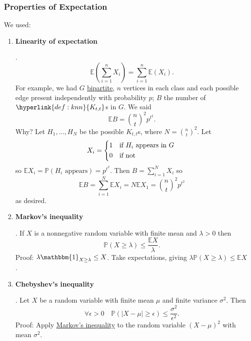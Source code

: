 \documentclass{article}
\begin{document}
\subsubsection*{Properties of Expectation}
We used:
\begin{enumerate}
    \item \hypertarget{def:linear}{\textbf{Linearity of expectation}}.
        \begin{equation*}
            \mathbb{E}\left(\sum_{i=1}^n X_i\right) = \sum_{i=1}^n \mathbb{E}(X_i).
        \end{equation*}
        For example, we had $G$ \hyperlink{def:bipartite}{bipartite}, $n$ vertices in each class and each possible edge present independently with probability $p$; $B$ the number of $\hyperlink{def:knn}{K_{t,t}}$s in $G$.
        We said
        \begin{equation*}
            \mathbb{E}B = \binom{n}{t}^2 p^{t^2}.
        \end{equation*}
        Why? Let $H_1, \dotsc, H_N$ be the possible $K_{t,t}$s, where $N = \binom{n}{t}^2$.
        Let
        \begin{equation*}
            X_i =
            \begin{cases*}
                1 & if $H_i$ appears in $G$ \\
                0 & if not
            \end{cases*}
        \end{equation*}
        so $\mathbb{E}X_i = \mathbb{P}(H_i \text{ appears}) = p^{t^2}.$
        Then $B = \sum_{i=1}^N X_i$ so
        \begin{equation*}
            \mathbb{E}B = \sum_{i=1}^N \mathbb{E}X_i = N \mathbb{E}X_1 = \binom{n}{t}^2 p^{t^2}
        \end{equation*}
        as desired.
    \item \hypertarget{def:markov}{\textbf{Markov's inequality}}.
        If $X$ is a nonnegative random variable with finite mean and $\lambda > 0$ then
        \begin{equation*}
            \mathbb{P}(X \geq \lambda) \leq \frac{\mathbb{E}X}{\lambda}.
        \end{equation*}
        Proof: $\lambda \mathbbm{1}_{X \geq \lambda} \leq X$. Take expectations, giving $\lambda \mathbb{P}(X \geq \lambda) \leq \mathbb{E} X$.
    \item \hypertarget{def:cheby}{\textbf{Chebyshev's inequality}}.
        Let $X$ be a random variable with finite mean $\mu$ and finite variance $\sigma^2$. Then
        \begin{equation*}
            \forall \epsilon > 0 \quad \mathbb{P}(|X - \mu| \geq \epsilon) \leq \frac{\sigma^2}{\epsilon^2}.
        \end{equation*}
        Proof: Apply \hyperlink{def:markov}{Markov's inequality} to the random variable $(X - \mu)^2$ with mean $\sigma^2$.
\end{enumerate}
\end{document}
